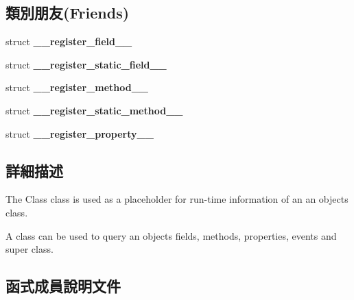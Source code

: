 \subsection*{類別朋友(Friends)}
\begin{DoxyCompactItemize}
\item 
struct {\bfseries \+\_\+\+\_\+register\+\_\+field\+\_\+\+\_\+}\hypertarget{classagm_1_1reflection_1_1_class_desc_a0c9c18280637c9c16861ff295e51cb2b}{}\label{classagm_1_1reflection_1_1_class_desc_a0c9c18280637c9c16861ff295e51cb2b}

\item 
struct {\bfseries \+\_\+\+\_\+register\+\_\+static\+\_\+field\+\_\+\+\_\+}\hypertarget{classagm_1_1reflection_1_1_class_desc_a7923aaf0cc5eabb2b11c2c85be040b21}{}\label{classagm_1_1reflection_1_1_class_desc_a7923aaf0cc5eabb2b11c2c85be040b21}

\item 
struct {\bfseries \+\_\+\+\_\+register\+\_\+method\+\_\+\+\_\+}\hypertarget{classagm_1_1reflection_1_1_class_desc_af8dbf4a67282001e87c7d10b3c644715}{}\label{classagm_1_1reflection_1_1_class_desc_af8dbf4a67282001e87c7d10b3c644715}

\item 
struct {\bfseries \+\_\+\+\_\+register\+\_\+static\+\_\+method\+\_\+\+\_\+}\hypertarget{classagm_1_1reflection_1_1_class_desc_a5ace0444458aca5c40ddf992ea8f41f0}{}\label{classagm_1_1reflection_1_1_class_desc_a5ace0444458aca5c40ddf992ea8f41f0}

\item 
struct {\bfseries \+\_\+\+\_\+register\+\_\+property\+\_\+\+\_\+}\hypertarget{classagm_1_1reflection_1_1_class_desc_a7bcea237c71f0fdf9bfa42b3450575dd}{}\label{classagm_1_1reflection_1_1_class_desc_a7bcea237c71f0fdf9bfa42b3450575dd}

\end{DoxyCompactItemize}


\subsection{詳細描述}
The Class class is used as a placeholder for run-\/time information of an an object\textquotesingle{}s class. 

A class can be used to query an object\textquotesingle{}s fields, methods, properties, events and super class. 

\subsection{函式成員說明文件}

